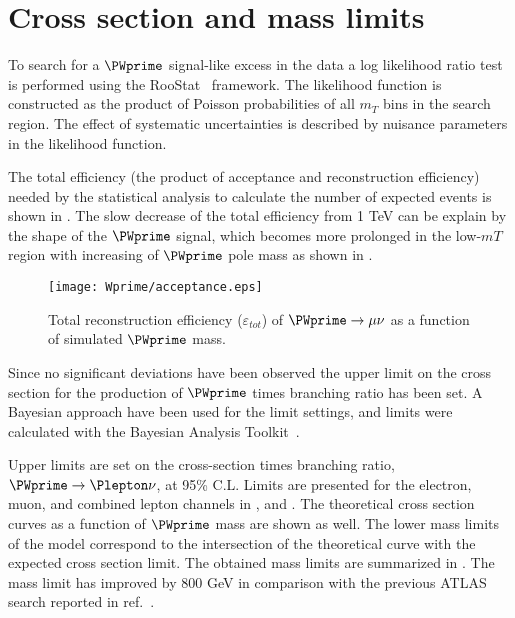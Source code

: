 \section{Cross section and mass limits}

To search for a $\PWprime$ signal-like excess in the data a log likelihood ratio test is performed using the RooStat~\cite{RooStat_project} framework.
The likelihood function is constructed as the product of Poisson probabilities of all $m_T$ bins in the search region.
The effect of systematic uncertainties is described by nuisance parameters in the likelihood function.

The total efficiency (the product of acceptance and reconstruction efficiency)
needed by the statistical analysis to calculate the number of expected events is shown in .
The slow decrease of the total efficiency from 1 TeV can be explain by the shape
of the $\PWprime$ signal, which becomes more prolonged in the low-$mT$ region with increasing of $\PWprime$ pole mass as shown in .

\begin{figure}[]
  \centering
  \texttt{[image: Wprime/acceptance.eps]}
  \caption{
  Total reconstruction efficiency ($\varepsilon_{tot}$) of $\PWprime \to \mu \nu$ as a function of simulated $\PWprime$ mass.
  }
  \label{fig:AccEff_mu}
\end{figure}

Since no significant deviations have been observed the upper limit on the cross section for the production of $\PWprime$ times branching ratio has been set. 
A Bayesian approach have been used for the limit settings, and limits were calculated with the Bayesian Analysis Toolkit~\cite{BAT}.


Upper limits are set on the cross-section times branching ratio, $\PWprime \rightarrow \Plepton\nu$, at 95\% C.L. 
Limits are presented for the electron, muon, 
and combined lepton channels in ,  and .
The theoretical cross section curves as a function of $\PWprime$ mass are shown as well.
The lower mass limits of the model correspond to the intersection of the theoretical curve with the expected cross section limit. The obtained mass limits are summarized in . The mass limit has improved by 800 GeV in comparison with the previous ATLAS search reported in ref.~\cite{wprime_8TeV}.

